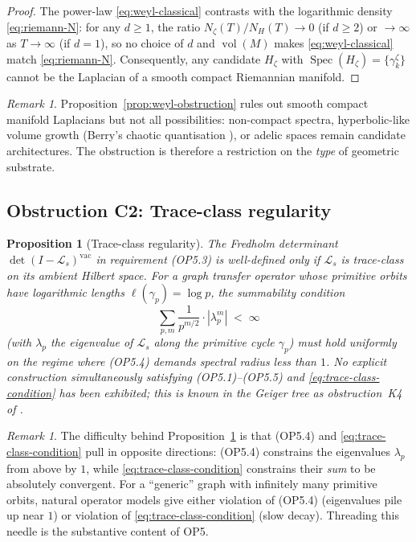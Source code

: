 \documentclass[11pt]{article}
\newtheorem{proposition}[theorem]{Proposition}
\theoremstyle{definition}
\theoremstyle{remark}
\newtheorem{remark}[theorem]{Remark}
\newcommand{\Spec}{\operatorname{Spec}}
\begin{document}
\begin{proof}
The power-law \eqref{eq:weyl-classical} contrasts with the
logarithmic density \eqref{eq:riemann-N}: for any $d \geq 1$, the
ratio $N_\zeta(T) / N_H(T) \to 0$ (if $d \geq 2$) or $\to \infty$ as
$T \to \infty$ (if $d = 1$), so no choice of $d$ and $\operatorname{vol}(M)$
makes \eqref{eq:weyl-classical} match \eqref{eq:riemann-N}.
Consequently, any candidate $H_\zeta$ with
$\Spec(H_\zeta) = \{\gamma_k^\zeta\}$ cannot be the Laplacian of a
smooth compact Riemannian manifold.
\end{proof}

\begin{remark}\label{rem:weyl-workarounds}
Proposition~\ref{prop:weyl-obstruction} rules out smooth compact
manifold Laplacians but not all possibilities: non-compact spectra,
hyperbolic-like volume growth (Berry's chaotic quantisation
\cite{Berry1985, BerryKeating1999}), or adelic spaces
\cite{Connes1999, Connes2026} remain candidate architectures. The
obstruction is therefore a restriction on the \emph{type} of
geometric substrate.
\end{remark}

\subsection{Obstruction C2: Trace-class regularity}
\label{sec:obs-C2}

\begin{proposition}[Trace-class regularity]\label{prop:trace-class}
The Fredholm determinant $\det(I - \mathcal{L}_s)^{\mathrm{vac}}$ in
requirement (OP5.3) is well-defined only if $\mathcal{L}_s$ is
trace-class on its ambient Hilbert space. For a graph transfer
operator whose primitive orbits have logarithmic lengths
$\ell(\gamma_p) = \log p$, the summability condition
\begin{equation}
\label{eq:trace-class-condition}
  \sum_{p,m} \frac{1}{p^{m/2}} \cdot |\lambda_p^m|
  \;<\; \infty
\end{equation}
(with $\lambda_p$ the eigenvalue of $\mathcal{L}_s$ along the primitive
cycle $\gamma_p$) must hold uniformly on the regime where (OP5.4)
demands spectral radius less than $1$. No explicit construction
simultaneously satisfying (OP5.1)--(OP5.5) and
\eqref{eq:trace-class-condition} has been exhibited; this is known in
the Geiger tree as obstruction~K4 of \cite{Geiger2026RHI}.
\end{proposition}

\begin{remark}\label{rem:trace-class-connection}
The difficulty behind Proposition~\ref{prop:trace-class} is that
(OP5.4) and \eqref{eq:trace-class-condition} pull in opposite
directions: (OP5.4) constrains the eigenvalues $\lambda_p$ from above
by $1$, while \eqref{eq:trace-class-condition} constrains their
\emph{sum} to be absolutely convergent. For a ``generic'' graph
with infinitely many primitive orbits, natural operator models give
either violation of (OP5.4) (eigenvalues pile up near $1$) or
violation of \eqref{eq:trace-class-condition} (slow decay). Threading
this needle is the substantive content of OP5.
\end{remark}
\end{document}
